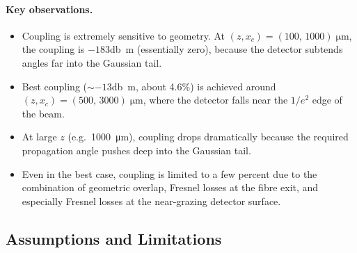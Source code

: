 \paragraph{Key observations.}
\begin{itemize}
  \item Coupling is extremely sensitive to geometry.  At
    $(z, x_c) = (100,\,1000)\;\si{\micro\metre}$, the coupling is
    $-183$\;\si{\decibel m} (essentially zero), because the detector
    subtends angles far into the Gaussian tail.
  \item Best coupling (${\sim}-13$\;\si{\decibel m}, about 4.6\%) is
    achieved around $(z, x_c) = (500,\,3000)\;\si{\micro\metre}$,
    where the detector falls near the $1/e^2$ edge of the beam.
  \item At large $z$ (e.g.\ \SI{1000}{\micro\metre}), coupling drops
    dramatically because the required propagation angle pushes deep into
    the Gaussian tail.
  \item Even in the best case, coupling is limited to a few percent
    due to the combination of geometric overlap, Fresnel losses at
    the fibre exit, and especially Fresnel losses at the near-grazing
    detector surface.
\end{itemize}

\subsection{Assumptions and Limitations}

